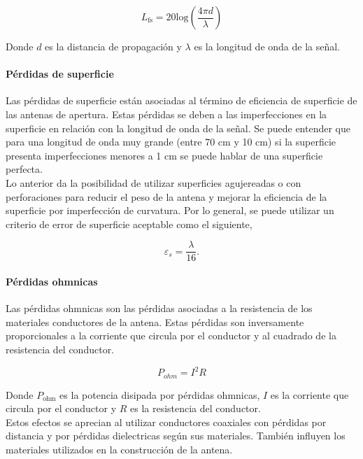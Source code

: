 \begin{equation}
    L_{\text{fs}} = 20\text{log}\left(\frac{4\pi d}{\lambda}\right)
\end{equation}

Donde $d$ es la distancia de propagación y $\lambda$ es la longitud de onda de la señal.\\

\paragraph{Pérdidas de superficie}

Las pérdidas de superficie están asociadas al término de eficiencia de superficie de las antenas de apertura. Estas pérdidas se deben a las imperfecciones en la superficie en relación con la longitud de onda de la señal. Se puede entender que para una longitud de onda muy grande (entre 70 cm y 10 cm) si la superficie presenta imperfecciones menores a 1 cm se puede hablar de una superficie perfecta.\\

Lo anterior da la posibilidad de utilizar superficies agujereadas o con perforaciones para reducir el peso de la antena y mejorar la eficiencia de la superficie por imperfección de curvatura. Por lo general, se puede utilizar un criterio de error de superficie aceptable como el siguiente,

\begin{equation}
    \varepsilon_{s} = \frac{\lambda}{16}\text{.}
\end{equation}

\paragraph{Pérdidas ohmnicas}

Las pérdidas ohmnicas son las pérdidas asociadas a la resistencia de los materiales conductores de la antena. Estas pérdidas son inversamente proporcionales a la corriente que circula por el conductor y al cuadrado de la resistencia del conductor.

\begin{equation}
    P_{ohm} = I^{2}R
\end{equation}

Donde $P_{\text{ohm}}$ es la potencia disipada por pérdidas ohmnicas, $I$ es la corriente que circula por el conductor y $R$ es la resistencia del conductor.\\

Estos efectos se aprecian al utilizar conductores coaxiales con pérdidas por distancia y por pérdidas dielectricas según sus materiales. También influyen los materiales utilizados en la construcción de la antena.\\

